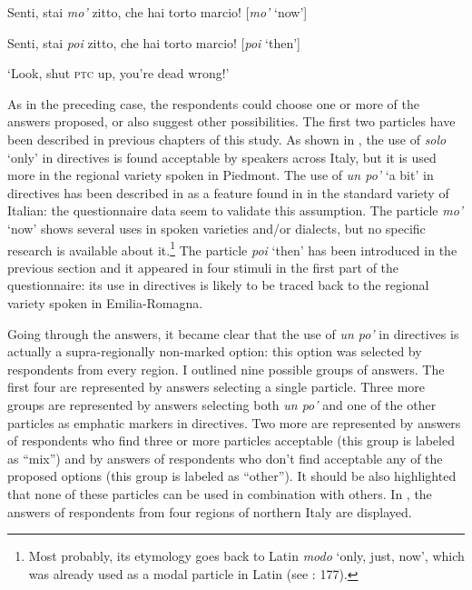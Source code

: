 Senti, stai \textit{mo’} zitto, che hai torto marcio! [\textit{mo’} ‘now’]

  Senti, stai \textit{poi} zitto, che hai torto marcio!   [\textit{poi} ‘then’]

\glt ‘Look, shut \textsc{ptc} up, you’re dead wrong!’
    \z %

As in the preceding case, the respondents could choose one or more of the answers proposed, or also suggest other possibilities. The first two particles have been described in previous chapters of this study. As shown in , the use of \textit{solo} ‘only’ in directives is found acceptable by speakers across Italy, but it is used more in the regional variety spoken in Piedmont. The use of \textit{un po’} ‘a bit’ in directives has been described in  as a feature found in in the standard variety of Italian: the questionnaire data seem to validate this assumption. The particle \textit{mo’} ‘now’ shows several uses in spoken varieties and/or dialects, but no specific research is available about it.\footnote{Most probably, its etymology goes back to Latin \textit{modo} ‘only, just, now’, which was already used as a modal particle in Latin (see \citealt{Kroon2011}: 177).} The particle \textit{poi} ‘then’ has been introduced in the previous section and it appeared in four stimuli in the first part of the questionnaire: its use in directives is likely to be traced back to the regional variety spoken in Emilia-Romagna.

Going through the answers, it became clear that the use of \textit{un po’} in directives is actually a supra-regionally non-marked option: this option was selected by respondents from every region. I outlined nine possible groups of answers. The first four are represented by answers selecting a single particle. Three more groups are represented by answers selecting both \textit{un po’} and one of the other particles as emphatic markers in directives. Two more are represented by answers of respondents who find three or more particles acceptable (this group is labeled as “mix”) and by answers of respondents who don’t find acceptable any of the proposed options (this group is labeled as “other”). It should be also highlighted that none of these particles can be used in combination with others. In , the answers of respondents from four regions of northern Italy are displayed.


